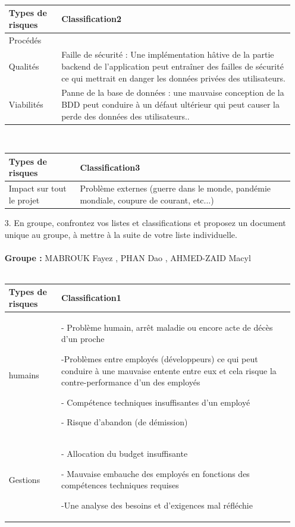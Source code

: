 \documentclass[12pt]{article}
\begin{document}
\begin{itemize}
\begin{tabular}{|p{3.5cm}|p{5cm}|}
	\hline 
\end{tabular}\\
\begin{tabular}{|p{3.5cm}|p{5cm}|} 
	\hline  
	\centering Types de risques & \raggedright  Classification2 \tabularnewline  
	\hline
	\raggedleft Procédés&  \tabularnewline  
	\hline  
	\raggedleft Qualités & Faille de sécurité : Une implémentation hâtive de la partie backend de l’application peut entraîner des failles de sécurité ce qui mettrait en danger les données privées des utilisateurs. \tabularnewline  
	\hline  
	\raggedleft Viabilités & Panne de la base de données : une mauvaise conception de la BDD peut conduire à un défaut ultérieur qui peut causer la perde des données des utilisateurs.. \tabularnewline 
	\hline 
\end{tabular}\\
\begin{tabular}{|p{3.5cm}|p{5cm}|} 
	\hline  
	\centering Types de risques & \raggedright  Classification3 \tabularnewline  
	\hline
	\raggedleft Impact sur tout le projet& Problème externes (guerre dans le monde, pandémie mondiale, coupure de courant, etc...)
	  \tabularnewline  
	\hline  
\end{tabular}
	\item[3. ] En groupe, confrontez vos listes et classifications et proposez un document unique au
	groupe, à mettre à la suite de votre liste individuelle.\\
	\\
	\textbf{Groupe :} MABROUK Fayez , PHAN Dao , AHMED-ZAID Macyl\\
	\\
	\begin{tabular}{|p{3.5cm}|p{8cm}|} 
		\hline  
		\centering Types de risques & \raggedright  Classification1 \tabularnewline  
		\hline
		\raggedleft humains&  - Problème humain, arrêt maladie ou encore acte de décès d’un proche
		
		-Problèmes entre employés (développeurs) ce qui peut conduire à une mauvaise entente entre eux et cela risque la contre-performance d’un des employés
		
		- Compétence techniques insuffisantes d’un employé
		
		- Risque d’abandon (de démission)
		 \tabularnewline  
		\hline  
		\raggedleft Gestions & - Allocation du budget insuffisante
		
		- Mauvaise embauche des employés en fonctions des compétences techniques requises
		
		-Une analyse des besoins et d’exigences mal réfléchie 
		

\end{tabular}
\end{itemize}
\end{document}
